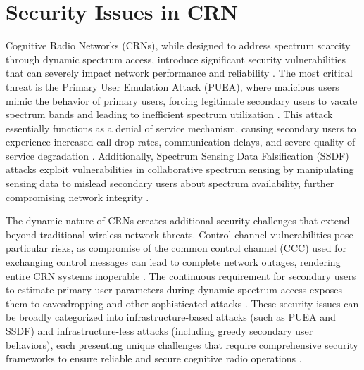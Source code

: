 \section{\textbf{Security Issues in CRN}}

Cognitive Radio Networks (CRNs), while designed to address spectrum scarcity through dynamic spectrum access, introduce significant security vulnerabilities that can severely impact network performance and reliability \cite{ref25}. The most critical threat is the Primary User Emulation Attack (PUEA), where malicious users mimic the behavior of primary users, forcing legitimate secondary users to vacate spectrum bands and leading to inefficient spectrum utilization \cite{ref7}. This attack essentially functions as a denial of service mechanism, causing secondary users to experience increased call drop rates, communication delays, and severe quality of service degradation \cite{ref1}. Additionally, Spectrum Sensing Data Falsification (SSDF) attacks exploit vulnerabilities in collaborative spectrum sensing by manipulating sensing data to mislead secondary users about spectrum availability, further compromising network integrity \cite{ref6}.

The dynamic nature of CRNs creates additional security challenges that extend beyond traditional wireless network threats. Control channel vulnerabilities pose particular risks, as compromise of the common control channel (CCC) used for exchanging control messages can lead to complete network outages, rendering entire CRN systems inoperable \cite{ref25}. The continuous requirement for secondary users to estimate primary user parameters during dynamic spectrum access exposes them to eavesdropping and other sophisticated attacks \cite{ref3}. These security issues can be broadly categorized into infrastructure-based attacks (such as PUEA and SSDF) and infrastructure-less attacks (including greedy secondary user behaviors), each presenting unique challenges that require comprehensive security frameworks to ensure reliable and secure cognitive radio operations \cite{ref1,ref7}.
